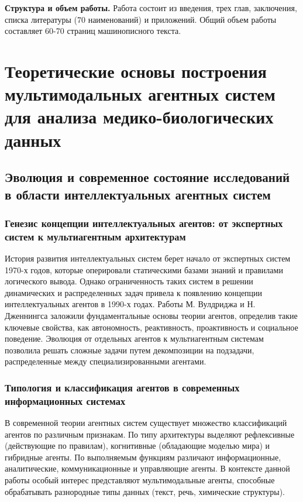 \documentclass[a4paper,14pt]{extarticle}
\begin{document}
	\textbf{Структура и объем работы.} Работа состоит из введения, трех глав, заключения, списка литературы (70 наименований) и приложений. Общий объем работы составляет 60-70 страниц машинописного текста.
	\newpage
	
	\section{Теоретические основы построения мультимодальных агентных систем для анализа медико-биологических данных}
	
	\subsection{Эволюция и современное состояние исследований в области интеллектуальных агентных систем}
	
	\subsubsection{Генезис концепции интеллектуальных агентов: от экспертных систем к мультиагентным архитектурам}
	История развития интеллектуальных систем берет начало от экспертных систем 1970-х годов, которые оперировали статическими базами знаний и правилами логического вывода. Однако ограниченность таких систем в решении динамических и распределенных задач привела к появлению концепции интеллектуальных агентов в 1990-х годах. Работы М. Вулдриджа и Н. Дженнингса заложили фундаментальные основы теории агентов, определив такие ключевые свойства, как автономность, реактивность, проактивность и социальное поведение. Эволюция от отдельных агентов к мультиагентным системам позволила решать сложные задачи путем декомпозиции на подзадачи, распределенные между специализированными агентами.
	
	\subsubsection{Типология и классификация агентов в современных информационных системах}
	В современной теории агентных систем существует множество классификаций агентов по различным признакам. По типу архитектуры выделяют рефлексивные (действующие по правилам), когнитивные (обладающие моделью мира) и гибридные агенты. По выполняемым функциям различают информационные, аналитические, коммуникационные и управляющие агенты. В контексте данной работы особый интерес представляют мультимодальные агенты, способные обрабатывать разнородные типы данных (текст, речь, химические структуры).
	
\end{document}

